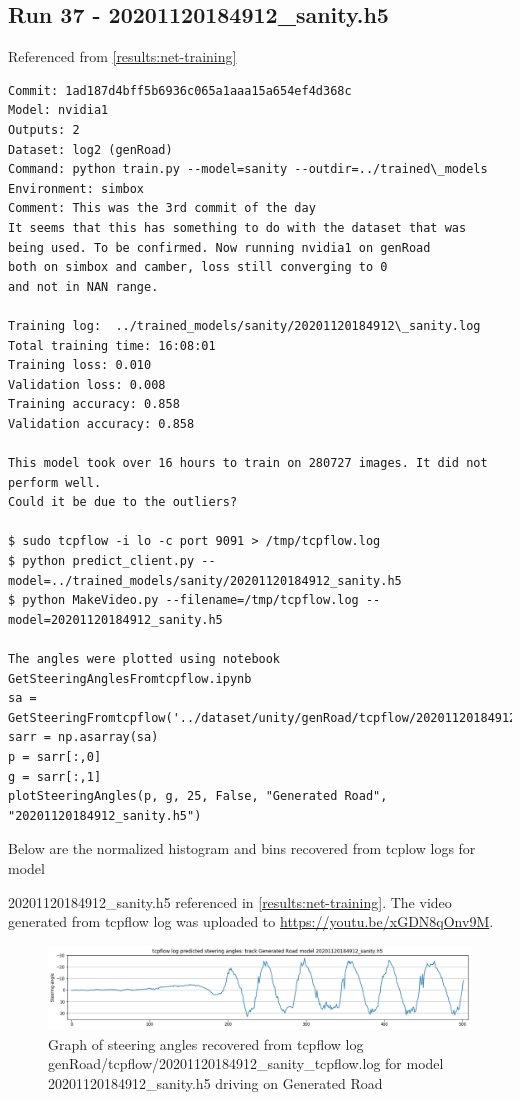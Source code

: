 \subsection{Run 37 - 20201120184912\_sanity.h5}
Referenced from \ref{results:net-training} 
\label{app_res:37}
\begin{verbatim}
Commit: 1ad187d4bff5b6936c065a1aaa15a654ef4d368c
Model: nvidia1
Outputs: 2
Dataset: log2 (genRoad)
Command: python train.py --model=sanity --outdir=../trained\_models
Environment: simbox
Comment: This was the 3rd commit of the day
It seems that this has something to do with the dataset that was
being used. To be confirmed. Now running nvidia1 on genRoad
both on simbox and camber, loss still converging to 0
and not in NAN range. 

Training log:  ../trained_models/sanity/20201120184912\_sanity.log
Total training time: 16:08:01
Training loss: 0.010
Validation loss: 0.008
Training accuracy: 0.858
Validation accuracy: 0.858

This model took over 16 hours to train on 280727 images. It did not perform well.
Could it be due to the outliers?

$ sudo tcpflow -i lo -c port 9091 > /tmp/tcpflow.log
$ python predict_client.py --model=../trained_models/sanity/20201120184912_sanity.h5
$ python MakeVideo.py --filename=/tmp/tcpflow.log --model=20201120184912_sanity.h5

The angles were plotted using notebook GetSteeringAnglesFromtcpflow.ipynb
sa = GetSteeringFromtcpflow('../dataset/unity/genRoad/tcpflow/20201120184912_sanity.log')
sarr = np.asarray(sa)
p = sarr[:,0]
g = sarr[:,1]
plotSteeringAngles(p, g, 25, False, "Generated Road", "20201120184912_sanity.h5")

\end{verbatim}
Below are the normalized histogram and bins recovered from tcplow logs for model  
  
20201120184912\_sanity.h5 referenced in \ref{results:net-training}. The video generated from tcpflow log was uploaded to \href{https://youtu.be/xGDN8qOnv9M}{https://youtu.be/xGDN8qOnv9M}.

\begin{figure}[ht]
 \centering 
 \includegraphics[width=\textwidth]{Figures/tcpflow_20201120184912_sanity_graph.png}
 \caption{Graph of steering angles recovered from tcpflow log genRoad/tcpflow/20201120184912\_sanity\_tcpflow.log for model 20201120184912\_sanity.h5 driving on Generated Road}
 \label{fig:tcpflow_20201120184912_graph}
\end{figure}

